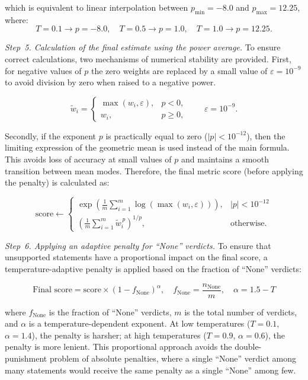 \documentclass[sn-basic]{sn-jnl}
\theoremstyle{thmstyleone}%
\theoremstyle{thmstyletwo}%
\theoremstyle{thmstylethree}%
\begin{document}
which is equivalent to linear interpolation between $p_{\min} = -8.0$ and $p_{\max} = 12.25$, 
where:
\[
T = 0.1 \rightarrow p = -8.0,\quad
T = 0.5 \rightarrow p = 1.0,\quad
T = 1.0 \rightarrow p = 12.25.
\]

\textit{Step~5. Calculation of the final estimate using the power average.} 
To ensure correct calculations, two mechanisms of numerical stability are provided. First, for negative values of $p$ the zero weights are replaced by a small value of $\varepsilon = 10^{-9}$ to avoid division by zero when raised to a negative power.

\[
\tilde{w}_i =
\begin{cases}
\max(w_i, \varepsilon), & p < 0,\\
w_i, & p \ge 0,
\end{cases}
\qquad \varepsilon = 10^{-9}.
\]

Secondly, if the exponent $p$ is practically equal to zero ($|p| < 10^{-12}$), then the limiting expression of the geometric mean is used instead of the main formula. This avoids loss of accuracy at small values of $p$ and maintains a smooth transition between mean modes. Therefore, the final metric score (before applying the penalty) is calculated as:

\begin{equation}
\text{score} \leftarrow
\begin{cases}
\exp\!\left( \frac{1}{m} \displaystyle\sum_{i=1}^m \log(\max(w_i, \varepsilon)) \right), & |p| < 10^{-12}\\[10pt]
\left( \frac{1}{m} \displaystyle\sum_{i=1}^m \tilde{w}_i^{\,p} \right)^{\!1/p}, & \text{otherwise.
}
\end{cases}
\end{equation}

\textit{Step~6. Applying an adaptive penalty for ``None'' verdicts.} To ensure that unsupported statements have a proportional impact on the final score, a temperature-adaptive penalty is applied based on the fraction of ``None'' verdicts:

\begin{equation}
\text{Final score} = \text{score} \times (1 - f_{\text{None}})^{\alpha},
\quad f_{\text{None}} = \frac{n_{\text{None}}}{m},
\quad \alpha = 1.5 - T
\end{equation}

where $f_{\text{None}}$ is the fraction of ``None'' verdicts, $m$ is the total number of verdicts, and $\alpha$ is a temperature-dependent exponent. At low temperatures ($T = 0.1$, $\alpha = 1.4$), the penalty is harsher; at high temperatures ($T = 0.9$, $\alpha = 0.6$), the penalty is more lenient. This proportional approach avoids the double-punishment problem of absolute penalties, where a single ``None'' verdict among many statements would receive the same penalty as a single ``None'' among few.
\end{document}
